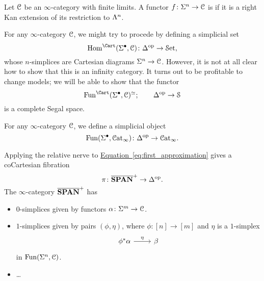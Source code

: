 \documentclass[main.tex]{subfiles}
\begin{document}
\begin{definition}[Cartesian]
  \label{def:cartesian}
  Let $\mathcal{C}$ be an $\infty$-category with finite limits. A functor $f\colon \Sigma^{n} \to \mathcal{C}$ is  if it is a right Kan extension of its restriction to $\Lambda^{n}$.
\end{definition}

For any $\infty$-category $\mathcal{C}$, we might try to procede by defining a simplicial set
\begin{equation*}
  \Hom^{\Cart}(\Sig^{\bullet}, \category{C})\colon \D\op \to \Set,
\end{equation*}
whose $n$-simplices are Cartesian diagrams $\Sigma^{n} \to \mathcal{C}$. However, it is not at all clear how to show that this is an infinity category. It turns out to be profitable to change models; we will be able to show that the functor
\begin{equation*}
  \Fun^{\Cart}(\Sig^{\bullet}, \category{C})^{\simeq};\qquad \D\op \to \S
\end{equation*}
is a complete Segal space.

For any $\infty$-category $\mathcal{C}$, we define a simplicial object
\begin{equation}
  \label{eq:first_approximation}
  \mathrm{Fun}(\Sigma^{\bullet}, \mathcal{C}\mathrm{at}_{\infty})\colon \Delta^{\mathrm{op}} \to \mathcal{C}\mathrm{at}_{\infty}.
\end{equation}

Applying the relative nerve to \hyperref[eq:first_approximation]{Equation~\ref*{eq:first_approximation}} gives a coCartesian fibration
\begin{equation*}
  \pi\colon \overline{\mathbf{SPAN}}^{+} \to \Delta^{\mathrm{op}}.
\end{equation*}
The $\infty$-category $\overline{\mathbf{SPAN}}^{+}$ has
\begin{itemize}
  \item $0$-simplices given by functors $\alpha\colon \Sigma^{m} \to \mathcal{C}$.

  \item $1$-simplices given by pairs $(\phi, \eta)$, where $\phi\colon [n] \to [m]$ and $\eta$ is a $1$-simplex
    \begin{equation*}
      \begin{tikzcd}
        \phi^{*}\alpha
        \arrow[r, "\eta"]
        & \beta
      \end{tikzcd}
    \end{equation*}
    in $\mathrm{Fun}(\Sigma^{n}, \mathcal{C})$.

  \item \dots
\end{itemize}
\end{document}
